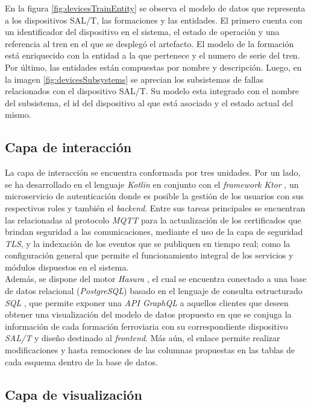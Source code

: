 En la figura \ref{fig:devicesTrainEntity} se observa el modelo de datos que representa a los dispositivos SAL/T, las formaciones y las entidades. 
El primero cuenta con un identificador del dispositivo en el sistema, el estado de operación y una referencia al tren en el que se desplegó el artefacto. 
El modelo de la formación está enriquecido con la entidad a la que pertenece y el numero de serie del tren. 
Por último, las entidades están compuestas por nombre y descripción.
Luego, en la imagen \ref{fig:devicesSubsystems} se aprecian los subsistemas de fallas relacionados con el dispositivo SAL/T.
Su modelo esta integrado con el nombre del subsistema, el id del dispositivo al que está asociado y el estado actual del mismo. 

\subsection{Capa de interacción}

La capa de interacción se encuentra conformada por tres unidades. Por un lado, se ha desarrollado en el lenguaje \textit{Kotlin} \cite{b14} en conjunto con el \textit{framework} \textit{Ktor} \cite{b15}, un microservicio de autenticación donde es posible la gestión de los usuarios con sus respectivos roles y también el \textit{backend}. Entre sus tareas principales se encuentran las relacionadas al protocolo \textit{MQTT} para la actualización de los certificados que brindan seguridad a las comunicaciones, mediante el uso de la capa de seguridad \textit{TLS}, y la indexación de los eventos que se publiquen en tiempo real; como la configuración general que permite el funcionamiento integral de los servicios y módulos dispuestos en el sistema. \\

Además, se dispone del motor \textit{Hasura} \cite{b16}, el cual se encuentra conectado a una base de datos relacional (\textit{PostgreSQL}) basado en el lenguaje de consulta estructurado \textit{SQL} \cite{b17}, que permite exponer una \textit{API GraphQL} \cite{b18} a aquellos clientes que deseen obtener una visualización del modelo de datos propuesto en que se conjuga la información de cada formación ferroviaria con su correspondiente dispositivo \textit{SAL/T} y diseño destinado al \textit{frontend}. Más aún, el enlace permite realizar modificaciones y hasta remociones de las columnas propuestas en las tablas de cada esquema dentro de la base de datos.


\subsection{Capa de visualización}

